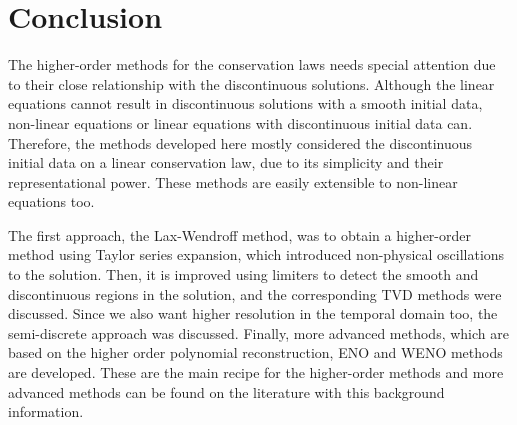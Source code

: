 \documentclass[journal,onecolumn]{IEEEtran}
\begin{document}
\section{Conclusion}
The higher-order methods for the conservation laws needs special attention due to their close relationship with the discontinuous solutions. Although the linear equations cannot result in discontinuous solutions with a smooth initial data, non-linear equations or linear equations with discontinuous initial data can. Therefore, the methods developed here mostly considered the discontinuous initial data on a linear conservation law, due to its simplicity and their representational power. These methods are easily extensible to non-linear equations too.
\par
The first approach, the Lax-Wendroff method, was to obtain a higher-order method using Taylor series expansion, which introduced non-physical oscillations to the solution. Then, it is improved using limiters to detect the smooth and discontinuous regions in the solution, and the corresponding TVD methods were discussed. Since we also want higher resolution in the temporal domain too, the semi-discrete approach was discussed. Finally, more advanced methods, which are based on the higher order polynomial reconstruction, ENO and WENO methods are developed. These are the main recipe for the higher-order methods and more advanced methods can be found on the literature with this background information.

%
%
\end{document}
